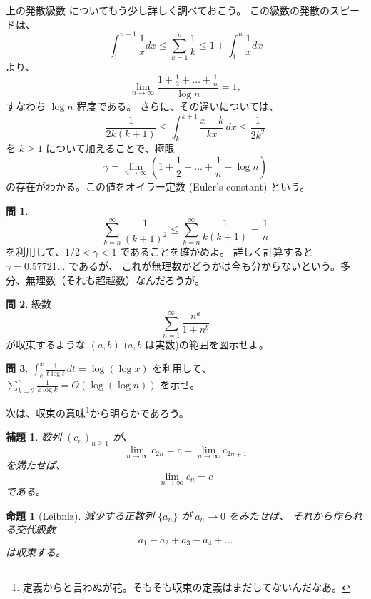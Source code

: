 \documentclass[a4paper]{jsarticle}
\newtheorem{Lemma}[Theorem]{補題}
\newtheorem{Proposition}[Theorem]{命題}
\theoremstyle{definition}
\newtheorem{Exercise}{問}%
\theoremstyle{remark}
\begin{document}
上の発散級数
についてもう少し詳しく調べておこう。
この級数の発散のスピードは、
\[
\int_1^{n+1} \frac{1}{x} dx
\leq \sum_{k=1}^n \frac{1}{k} 
\leq 
1 + \int_1^n \frac{1}{x} dx 
\]
より、
\[
\lim_{n \to \infty} 
\frac{1 + \frac{1}{2} + \dots + \frac{1}{n}}{\log n} = 1, 
\]
すなわち $\log n$ 程度である。
さらに、その違いについては、
\[
\frac{1}{2k(k+1)} \leq \int_k^{k+1} \frac{x-k}{kx}\, dx 
\leq \frac{1}{2k^2} 
\]
を $k \geq 1$ について加えることで、極限
\[
\gamma = \lim_{n \to \infty} 
\left( 
1 + \frac{1}{2} + \dots + \frac{1}{n} - \log n 
\right) 
\]
の存在がわかる。この値をオイラー定数 (Euler's constant) という。

\begin{Exercise}
\[
\sum_{k=n}^\infty \frac{1}{(k+1)^2} \leq \sum_{k=n}^\infty \frac{1}{k(k+1)} = \frac{1}{n}
\]
を利用して、$1/2 < \gamma < 1$ であることを確かめよ。
詳しく計算すると $\gamma = 0.57721\dots$ であるが、
これが無理数かどうかは今も分からないという。多分、無理数（それも超越数）なんだろうが。
\end{Exercise}

\begin{Exercise}
級数 
\[ 
\sum_{n=1}^\infty \frac{n^a}{1+ n^b} 
\]
が収束するような $(a,b)$ ($a,b$ は実数)の範囲を図示せよ。
\end{Exercise}

\begin{Exercise}
  $\displaystyle \int_e^x \frac{1}{t\log t}\, dt = \log(\log x)$ を利用して、
  $\displaystyle \sum_{k=2}^n \frac{1}{k\log k} = O(\log(\log n))$ を示せ。
\end{Exercise}

次は、収束の意味\footnote{定義からと言わぬが花。そもそも収束の定義はまだしてないんだなあ。}から明らかであろう。

\begin{Lemma}
数列 $(c_n)_{n \geq 1}$ が、
\[
\lim_{n \to \infty} c_{2n} = c = \lim_{n \to \infty} c_{2n+1}
\]
を満たせば、
\[
\lim_{n \to \infty} c_n = c
\]
である。
\end{Lemma}

\begin{Proposition}[Leibniz]
減少する正数列 $\{ a_n\}$ が $a_n \to 0$ をみたせば、
それから作られる交代級数 
\[
a_1 - a_2 + a_3 - a_4 + \dots 
\]
は収束する。
\end{Proposition}
\end{document}
